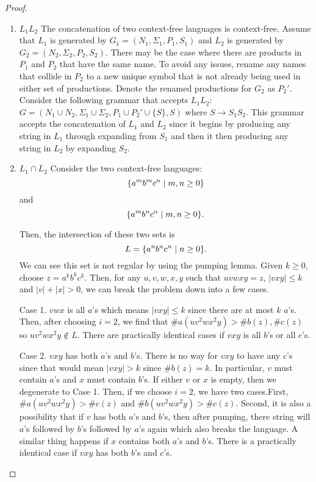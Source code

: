 \documentclass{article}
\newcommand{\setst}{\hspace{1mm} | \hspace{1mm} }
\theoremstyle{definition}
\begin{document}
\begin{enumerate}
\begin{proof}
	\leavevmode
	\begin{enumerate}
		\item $L_1L_2$ 
		The concatenation of two context-free languages is context-free. Assume that $L_1$ is generated by $G_1 = (N_1,\Sigma_1,P_1,S_1)$ and $L_2$ is generated by $G_2 = (N_2,\Sigma_2,P_2,S_2)$. There may be the case where there are products in $P_1$ and $P_2$ that have the same name. To avoid any issues, rename any names that collide in $P_2$ to a new unique symbol that is not already being used in either set of productions. Denote the renamed productions for $G_2$ as $P_2'$. Consider the following grammar that accepts $L_1L_2$: $G = (N_1 \cup N_2, \Sigma_1 \cup \Sigma_2, P_1 \cup P_2' \cup \{S\}, S)$ where $S \rightarrow S_1S_2$. This grammar accepts the concatenation of $L_1$ and $L_2$ since it begins by producing any string in $L_1$ through expanding from $S_1$ and then it then producing any string in $L_2$ by expanding $S_2$. 
		\item $L_1 \cap L_2$
		Consider the two context-free languages:
		\[\{a^mb^mc^n \setst m,n \geq 0\}\]
		and
		\[\{a^mb^nc^n\setst m,n \geq 0\}.\]
		
		Then, the intersection of these two sets is 
		\[L = \{a^nb^nc^n \setst n \geq 0\}.\] 
		We can see this set is not regular by using the pumping lemma. Given $k \geq 0$, choose $z = a^kb^kc^k$. Then, for any $u,v,w,x,y$ such that $uvwxy = z$, $|vxy| \leq k$ and $|v| + |x| > 0$, we can break the problem down into a few cases. 
		
		Case 1. $vwx$ is all $a$'s which means $|vxy| \leq k$ since there are at most $k$ $a$'s. Then, after choosing $i = 2$, we find that $\#a(uv^2wx^2y) > \#b(z),\#c(z)$ so $uv^2wx^2y \not \in L$. There are practically identical cases if $vxy$ is all $b$'s or all $c$'s.
		
		Case 2. $vxy$ has both $a$'s and $b$'s. There is no way for $vxy$ to have any $c$'s since that would mean $|vxy| > k$ since $\#b(z) = k$. In particular, $v$ must contain $a$'s and $x$ must contain $b$'s. If either $v$ or $x$ is empty, then we degenerate to Case 1. Then, if we choose $i = 2$, we have two cases.First, $\#a(uv^2wx^2y) > \#c(z)$ and $\#b(uv^2wx^2y) > \#c(z)$. Second, it is also a possibility that if $v$ has both $a$'s and $b$'s, then after pumping, there string will $a$'s followed by $b$'s followed by $a$'s again which also breaks the language. A similar thing happens if $x$ contains both $a$'s and $b$'s. There is a practically identical case if $vxy$ has both $b$'s and $c$'s.
		

\end{enumerate}
\end{proof}
\end{enumerate}
\end{document}
